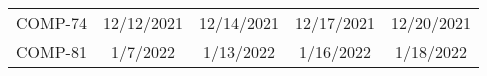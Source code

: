 \begin{landscape}
\begin{table}[htbp]
\begin{tabular*}{\linewidth}{@{\extracolsep{\fill}}ccccc}
    COMP-74   & 12/12/2021 & 12/14/2021 & 12/17/2021 & 12/20/2021 \\[2pt]
     COMP-81       & 1/7/2022 & 1/13/2022 & 1/16/2022 & 1/18/2022 \\

\end{tabular*}
\end{table}
\end{landscape}
